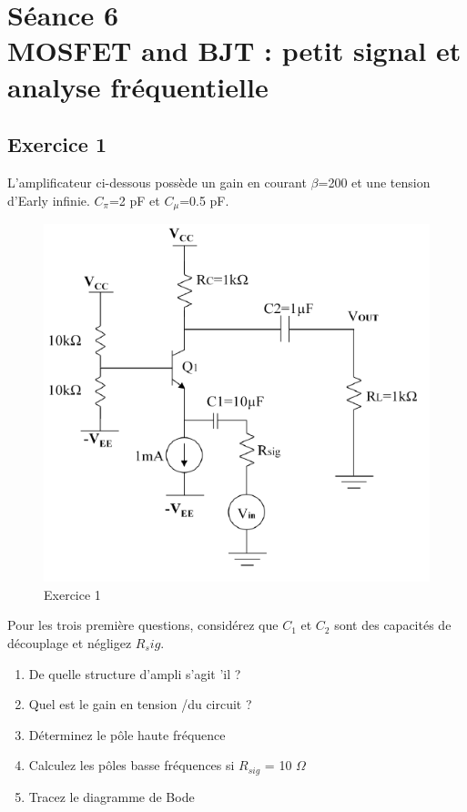 \documentclass[paper=a4, fontsize=11pt]{article} %
\numberwithin{equation}{section} %
\numberwithin{figure}{section} %
\numberwithin{table}{section} %
\begin{document}
\newpage
\setcounter{figure}{0}
\setcounter{section}{6}
\section{Séance 6\\ MOSFET and BJT : petit signal et analyse fréquentielle}
\subsection*{Exercice 1}
L'amplificateur ci-dessous possède un gain en courant $\beta$=200 et une tension d'Early \vea infinie. $C_\pi$=2 pF et $C_\mu$=0.5 pF.

\begin{figure}[!htbp]
   \centering
   \includegraphics[]{figure/fig6-1.png}
   \caption{Exercice 1}
   \label{fig6-1}
\end{figure}

Pour les trois première questions, considérez que $C_1$ et $C_2$ sont des capacités de découplage et négligez $R_sig$.
\begin{enumerate}
\item De quelle structure d'ampli s'agit 'il ?
\item Quel est le gain en tension \vout/\vin du circuit ?
\item Déterminez le pôle haute fréquence
	\item Calculez les pôles basse fréquences si $R_{sig}$ = 10 $\Omega$
 \item Tracez le diagramme de Bode
\end{enumerate}
\end{document}
